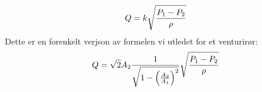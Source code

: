 \documentclass{beamer}
\begin{document}
\begin{frame}
	\frametitle{}

	



%
$$Q = k \sqrt{{P_1 - P_2} \over \rho}$$
%
Dette er en forenkelt verjson av formelen vi utledet for et venturirør:
%
$$Q = \sqrt{2} A_2 {1 \over \sqrt{1 - \left({A_2 \over A_1}\right)^2}} \sqrt{{P_1 - P_2} \over \rho}$$
%
%
%
\end{frame}
\end{document}
